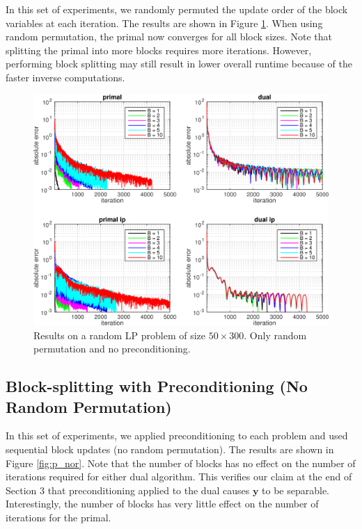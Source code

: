 \documentclass{article}
\begin{document}
In this set of experiments, we randomly permuted the update order of the block variables at each iteration. The results are shown in Figure \ref{fig:nop_r}. When using random permutation, the primal now converges for all block sizes. Note that splitting the primal into more blocks requires more iterations. However, performing block splitting may still result in lower overall runtime because of the faster inverse computations. 
\newline
\newline
\newline
\newline
\begin{figure}[h]
	\includegraphics[width=\textwidth]{../figures/noprecond_rndperm.png}
	\caption{Results on a random LP problem of size $50 \times 300$. Only random permutation and no preconditioning.}
	\label{fig:nop_r}
\end{figure}
\newpage
\subsection*{Block-splitting with Preconditioning (No Random Permutation)}
In this set of experiments, we applied preconditioning to each problem and used sequential block updates (no random permutation). The results are shown in Figure \ref{fig:p_nor}. Note that the number of blocks has no effect on the number of iterations required for either dual algorithm. This verifies our claim at the end of Section 3 that preconditioning applied to the dual causes $\mathbf{y}$ to be separable. Interestingly, the number of blocks has very little effect on the number of iterations for the primal. 
\end{document}

